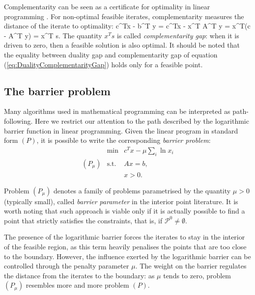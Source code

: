 Complementarity can be seen as a certificate for optimality 
in linear programming \cite{phd:Jansen,Schrijver86}.
For non-optimal feasible iterates, complementarity measures the distance of the
iterate to optimality:
\be  \label{eq:DualityComplementarityGap}
  c^Tx - b^T y = c^Tx - x^T A^T y = x^T(c - A^T y) = x^T s.
\ee
The quantity $x^T s$ is called {\em complementarity gap}:
when it is driven to zero, then a feasible solution is also optimal. 
It should be noted that the equality between duality gap and
complementarity gap of equation (\ref{eq:DualityComplementarityGap})
holds only for a feasible point.

%
%
\subsection{The barrier problem}

Many algorithms used in mathematical programming can be interpreted 
as path-following. Here we restrict our attention to the path described 
by the logarithmic barrier function in linear programming.
Given the linear program in standard form $(P)$,
it is possible to write the corresponding {\em barrier problem}:
\[
\begin{array}{crl}
         & \min        & c^Tx - \mu \sum_i \ln x_i \\
 (P_\mu) & \mbox{s.t.} & Ax = b, \\
         &             & x > 0.
\end{array}
\]

Problem $(P_\mu)$ denotes a family of problems parametrised by the 
quantity $\mu>0$ (typically small), called {\em barrier parameter} 
in the interior point literature. 
It is worth noting that such approach is 
viable only if it is actually possible to find a point that 
strictly satisfies the constraints, that is, if $\mathcal{P}^0 \ne \emptyset$.

The presence of the logarithmic barrier forces the iterates 
to stay in the interior of the feasible region, as this term heavily penalises 
the points that are too close to the boundary. However, the influence exerted
by the logarithmic barrier can be controlled through the penalty
parameter $\mu$.
The weight on the barrier regulates the distance from the iterates to 
the boundary: as $\mu$ tends to zero, problem $(P_\mu)$ resembles
more and more problem $(P)$.

